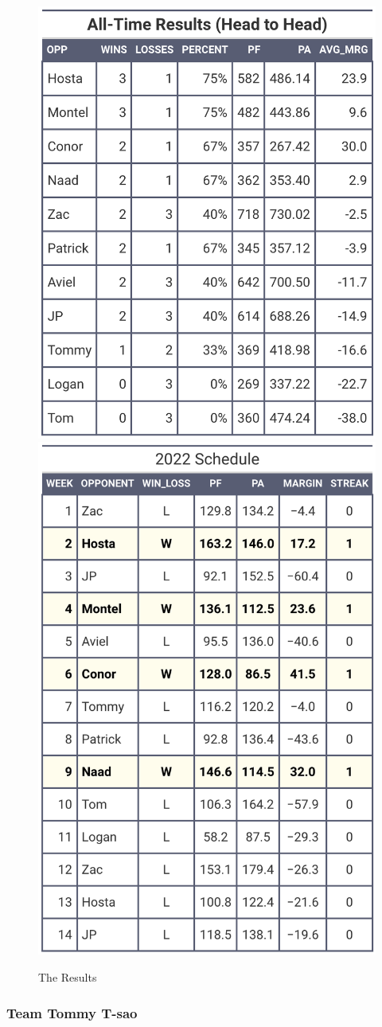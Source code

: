 \documentclass[
]{article}
\begin{document}
\begin{figure}
\includegraphics[width=0.5\linewidth,height=0.5\textheight]{output/headtohead/Randal_head_to_head} \includegraphics[width=0.5\linewidth,height=0.5\textheight]{output/py_schedule/season_results_Randal} \caption{The Results}\label{fig:unnamed-chunk-31}
\end{figure}

\hypertarget{team-tommy-t-sao}{%
\subsubsection{Team Tommy T-sao}\label{team-tommy-t-sao}}
\end{document}
